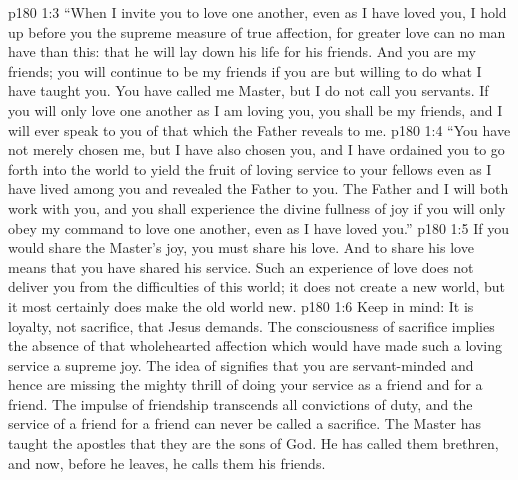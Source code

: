 \vs p180 1:3 \textcolor{ubdarkred}{“When I invite you to love one another, even as I have loved you, I hold up before you the supreme measure of true affection, for greater love can no man have than this: that he will lay down his life for his friends. And you are my friends; you will continue to be my friends if you are but willing to do what I have taught you. You have called me Master, but I do not call you servants. If you will only love one another as I am loving you, you shall be my friends, and I will ever speak to you of that which the Father reveals to me.}
\vs p180 1:4 \textcolor{ubdarkred}{“You have not merely chosen me, but I have also chosen you, and I have ordained you to go forth into the world to yield the fruit of loving service to your fellows even as I have lived among you and revealed the Father to you. The Father and I will both work with you, and you shall experience the divine fullness of joy if you will only obey my command to love one another, even as I have loved you.”}
\pc \vs p180 1:5 If you would share the Master’s joy, you must share his love. And to share his love means that you have shared his service. Such an experience of love does not deliver you from the difficulties of this world; it does not create a new world, but it most certainly does make the old world new.
\vs p180 1:6 Keep in mind: It is loyalty, not sacrifice, that Jesus demands. The consciousness of sacrifice implies the absence of that wholehearted affection which would have made such a loving service a supreme joy. The idea of  signifies that you are servant\hyp{}minded and hence are missing the mighty thrill of doing your service as a friend and for a friend. The impulse of friendship transcends all convictions of duty, and the service of a friend for a friend can never be called a sacrifice. The Master has taught the apostles that they are the sons of God. He has called them brethren, and now, before he leaves, he calls them his friends.\plusone
{}

